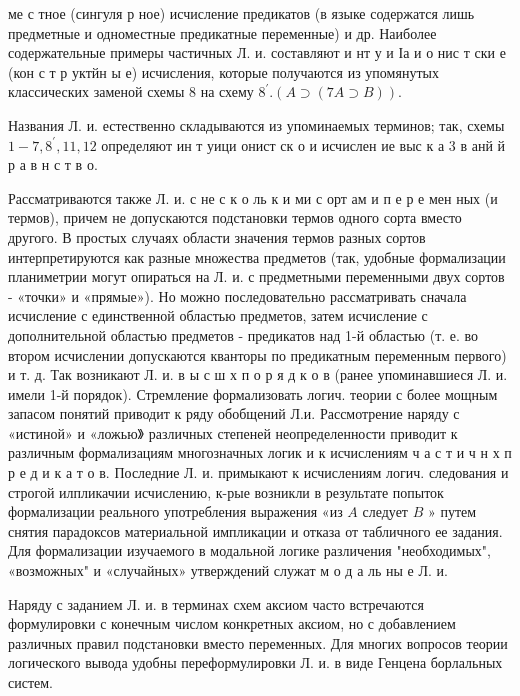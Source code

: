 \documentclass[10pt]{article}
\begin{document}
ме с тное (сингуля р ное) исчисление предикатов (в языке содержатся лишь предметные и одноместные предикатные переменные) и др. Наиболее содержательные примеры частичных Л. и. составляют и нт у и Іа и о нис т ски е (кон с т р уктйн ы е) исчисления, которые получаются из упомянутых классических заменой схемы 8 на схему $8^{\prime} .(A \supset(7 A \supset B))$.



Названия Л. и. естественно складываются из упоминаемых терминов; так, схемы $1-7,8^{\prime}, 11,12$ определяют ин т уици онист ск о и исчислен ие выс к а 3 в анй й р а в н с т в о.



Рассматриваются также Л. и. с не с к о ль к и ми с орт ам и п е р е мен ных (и термов), причем не допускаются подстановки термов одного сорта вместо другого. В простых случаях области значения термов разных сортов интерпретируются как разные множества предметов (так, удобные формализации планиметрии могут опираться на Л. и. с предметными переменными двух сортов - «точки» и «прямые»). Но можно последовательно рассматривать сначала исчисление с единственной областью предметов, затем исчисление с дополнительной областью предметов - предикатов над 1-й областью (т. е. во втором исчислении допускаются кванторы по предикатным переменным первого) и т. д. Так возникают Л. и. в ы с ш х п о р я д к о в (ранее упоминавшиеся Л. и. имели 1-й порядок). Стремление формализовать логич. теории с более мощным запасом понятий приводит к ряду обобщений Л.и. Рассмотрение наряду с «истиной» и «ложью》 различных степеней неопределенности приводит к различным формализациям многозначных логик и к исчислениям ч а с т и ч н х п р е д и к а т о в. Последние Л. и. примыкают к исчислениям логич. следования и строгой илпликачии исчислению, к-рые возникли в результате попыток формализации реального употребления выражения «из $A$ следует $B$ » путем снятия парадоксов материальной импликации и отказа от табличного ее задания. Для формализации изучаемого в модальной логике различения "необходимых", «возможных" и «случайных» утверждений служат м о д а ль ны е Л. и.



Наряду с заданием Л. и. в терминах схем аксиом часто встречаются формулировки с конечным числом конкретных аксиом, но с добавлением различных правил подстановки вместо переменных. Для многих вопросов теории логического вывода удобны переформулировки Л. и. в виде Генцена борлальных систем.
\end{document}
